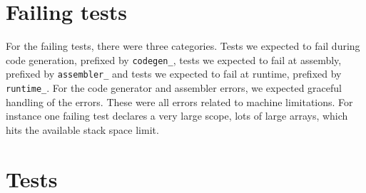 \documentclass[oneside]{amsart}
\theoremstyle{definition}
\theoremstyle{remark}
\numberwithin{equation}{section}
\begin{document}
\section{Failing tests}
For the failing tests, there were three categories. Tests we expected to fail during code
generation, prefixed by \texttt{codegen\_}, tests we expected to fail at assembly, prefixed by
\texttt{assembler\_} and tests we expected to fail at runtime, prefixed by \texttt{runtime\_}. For the
code generator and assembler errors, we expected graceful handling of the errors. These  were all
errors related to machine limitations. For instance one failing test declares a very large scope,
lots of large arrays, which hits the available stack space limit.

\newpage
{}

\section{Tests}
\end{document}
